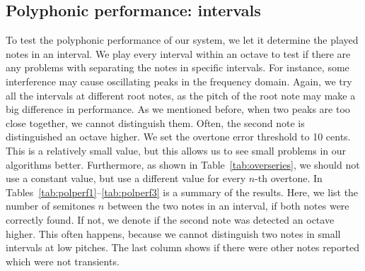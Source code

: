 \documentclass[10pt,twocolumn]{article}
\begin{document}
\subsection{Polyphonic performance: intervals}
To test the polyphonic performance of our system, we let it determine the played notes in an interval. We play every interval within an octave to test if there are any problems with separating the notes in specific intervals. For instance, some interference may cause oscillating peaks in the frequency domain. Again, we try all the intervals at different root notes, as the pitch of the root note may make a big difference in performance. As we mentioned before, when two peaks are too close together, we cannot distinguish them. Often, the second note is distinguished an octave higher. We set the overtone error threshold to 10 cents. This is a relatively small value, but this allows us to see small problems in our algorithms better. Furthermore, as shown in Table~\ref{tab:overseries}, we should not use a constant value, but use a different value for every $n$-th overtone. In Tables~\ref{tab:polperf1}--\ref{tab:polperf3} is a summary of the results. Here, we list the number of semitones $n$ between the two notes in an interval, if both notes were correctly found. If not, we denote if the second note was detected an octave higher. This often happens, because we cannot distinguish two notes in small intervals at low pitches. The last column shows if there were other notes reported which were not transients.
\end{document}
